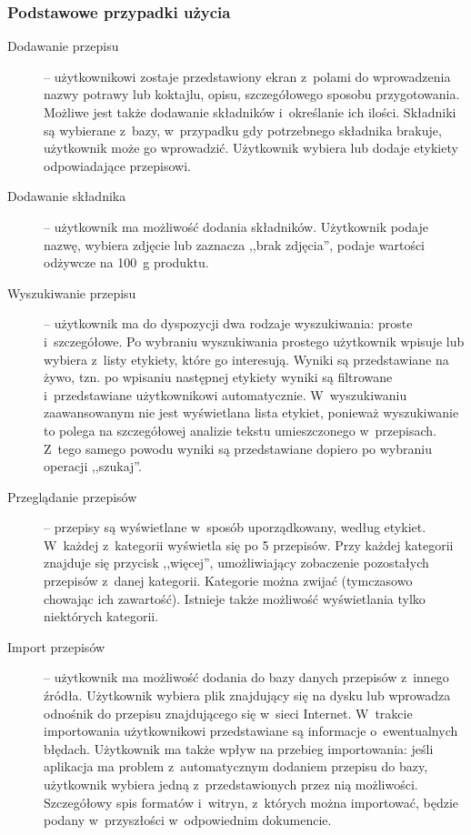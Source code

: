 \documentclass[a4paper,11pt,titlepage,twoside]{mwart}
\begin{document}
\subsubsection{Podstawowe przypadki użycia}
\begin{description}
\item[Dodawanie przepisu] -- użytkownikowi zostaje przedstawiony ekran z~polami do wprowadzenia nazwy potrawy lub koktajlu, opisu, szczegółowego sposobu przygotowania. Możliwe jest także dodawanie składników i~określanie ich ilości. Składniki są wybierane z~bazy, w~przypadku gdy potrzebnego składnika brakuje, użytkownik może go wprowadzić. Użytkownik wybiera lub dodaje etykiety odpowiadające przepisowi.
\item[Dodawanie składnika] -- użytkownik ma możliwość dodania składników. Użytkownik podaje nazwę, wybiera zdjęcie lub zaznacza ,,brak zdjęcia'', podaje wartości odżywcze na 100~g produktu.
\item[Wyszukiwanie przepisu] -- użytkownik ma do dyspozycji dwa rodzaje wyszukiwania: proste i~szczegółowe. Po wybraniu wyszukiwania prostego użytkownik wpisuje lub wybiera z~listy etykiety, które go interesują. Wyniki są przedstawiane na żywo, tzn. po wpisaniu następnej etykiety wyniki są filtrowane i~przedstawiane użytkownikowi automatycznie. W~wyszukiwaniu zaawansowanym nie jest wyświetlana lista etykiet, ponieważ wyszukiwanie to polega na szczegółowej analizie tekstu umieszczonego w~przepisach. Z~tego samego powodu wyniki są przedstawiane dopiero po wybraniu operacji ,,szukaj''.
\item[Przeglądanie przepisów] -- przepisy są wyświetlane w~sposób uporządkowany, według etykiet. W~każdej z~kategorii wyświetla się po 5 przepisów. Przy każdej kategorii znajduje się przycisk ,,więcej'', umożliwiający zobaczenie pozostałych przepisów z~danej kategorii. Kategorie można zwijać (tymczasowo chowając ich zawartość). Istnieje także możliwość wyświetlania tylko niektórych kategorii.
\item[Import przepisów] -- użytkownik ma możliwość dodania do bazy danych przepisów z~innego źródła. Użytkownik wybiera plik znajdujący się na dysku lub wprowadza odnośnik do przepisu znajdującego się w~sieci Internet. W~trakcie importowania użytkownikowi przedstawiane są informacje o~ewentualnych błędach. Użytkownik ma także wpływ na przebieg importowania: jeśli aplikacja ma problem z~automatycznym dodaniem przepisu do bazy, użytkownik wybiera jedną z~przedstawionych przez nią możliwości. Szczegółowy spis formatów i~witryn, z~których można importować, będzie podany w~przyszłości w~odpowiednim dokumencie.
\end{description}
\end{document}
